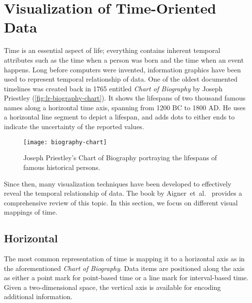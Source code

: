 \section{Visualization of Time-Oriented Data}
Time is an essential aspect of life; everything contains inherent temporal attributes such as the time when a person was born and the time when an event happens. Long before computers were invented, information graphics have been used to represent temporal relationship of data. One of the oldest documented timelines was created back in 1765 entitled \emph{Chart of Biography} by Joseph Priestley (\autoref{fig:lr-biography-chart}). It shows the lifespans of two thousand famous names along a horizontal time axis, spanning from 1200 BC to 1800 AD. He uses a horizontal line segment to depict a lifespan, and adds dots to either ends to indicate the uncertainty of the reported values. 

\begin{figure}[!htb]
	\centering
	\texttt{[image: biography-chart]}
	\caption{Joseph Priestley's Chart of Biography portraying the lifespans of famous historical persons. }
	\label{fig:lr-biography-chart}
\end{figure}

Since then, many visualization techniques have been developed to effectively reveal the temporal relationship of data. The book by Aigner~et~al.~\cite{Aigner2011} provides a comprehensive review of this topic. In this section, we focus on different visual mappings of time.

\subsection{Horizontal}
The most common representation of time is mapping it to a horizontal axis as in the aforementioned \emph{Chart of Biography}. Data items are positioned along the axis as either a point mark for point-based time or a line mark for interval-based time. Given a two-dimensional space, the vertical axis is available for encoding additional information.

